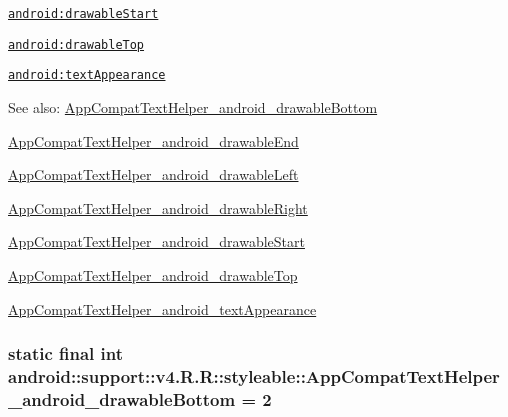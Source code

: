 {\tt \hyperlink{classandroid_1_1support_1_1v4_1_1_r_1_1styleable_bd3630b47fe4b2f49803b58778a2decc}{android:drawableStart}}

{\tt \hyperlink{classandroid_1_1support_1_1v4_1_1_r_1_1styleable_66f496b911feca00e39235282107091b}{android:drawableTop}}

{\tt \hyperlink{classandroid_1_1support_1_1v4_1_1_r_1_1styleable_42af8564f82204922d5e9775f92bb815}{android:textAppearance}}

\begin{Desc}
\item[See also:]\hyperlink{classandroid_1_1support_1_1v4_1_1_r_1_1styleable_e8e753980ae0cf7f493ad35506fd4eb8}{AppCompatTextHelper\_\-android\_\-drawableBottom} 

\hyperlink{classandroid_1_1support_1_1v4_1_1_r_1_1styleable_c2187047de5b30284c00a650592eaad5}{AppCompatTextHelper\_\-android\_\-drawableEnd} 

\hyperlink{classandroid_1_1support_1_1v4_1_1_r_1_1styleable_bc3975c5c5136d1f9f02b540cab86528}{AppCompatTextHelper\_\-android\_\-drawableLeft} 

\hyperlink{classandroid_1_1support_1_1v4_1_1_r_1_1styleable_9f63da404fcb525c4df8b777c6ae5ce5}{AppCompatTextHelper\_\-android\_\-drawableRight} 

\hyperlink{classandroid_1_1support_1_1v4_1_1_r_1_1styleable_bd3630b47fe4b2f49803b58778a2decc}{AppCompatTextHelper\_\-android\_\-drawableStart} 

\hyperlink{classandroid_1_1support_1_1v4_1_1_r_1_1styleable_66f496b911feca00e39235282107091b}{AppCompatTextHelper\_\-android\_\-drawableTop} 

\hyperlink{classandroid_1_1support_1_1v4_1_1_r_1_1styleable_42af8564f82204922d5e9775f92bb815}{AppCompatTextHelper\_\-android\_\-textAppearance} \end{Desc}
\hypertarget{classandroid_1_1support_1_1v4_1_1_r_1_1styleable_e8e753980ae0cf7f493ad35506fd4eb8}{
\subsubsection[{AppCompatTextHelper\_\-android\_\-drawableBottom}]{\setlength{\rightskip}{0pt plus 5cm}static final int android::support::v4.R.R::styleable::AppCompatTextHelper\_\-android\_\-drawableBottom = 2}}
\label{classandroid_1_1support_1_1v4_1_1_r_1_1styleable_e8e753980ae0cf7f493ad35506fd4eb8}


